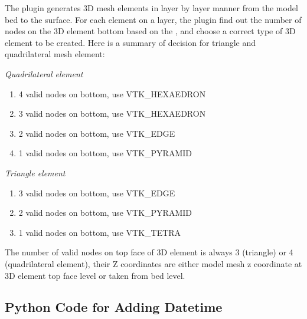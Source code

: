 \documentclass[12pt]{report}
\begin{document}
	The plugin generates 3D mesh elements in layer by layer manner from the model bed to the surface. For each element on a layer, the plugin find out the number of nodes on the 3D element bottom based on the , and choose a correct type of 3D element to be created. Here is a summary of decision for triangle and
quadrilateral mesh element:
	
\emph{Quadrilateral element}

\begin{enumerate}
\item  4 valid nodes on bottom, use VTK\_HEXAEDRON 
\item  3 valid nodes on bottom, use VTK\_HEXAEDRON
\item  2 valid nodes on bottom, use VTK\_EDGE
\item  1 valid nodes on bottom, use VTK\_PYRAMID
\end{enumerate}


\emph{Triangle element}

\begin{enumerate}
\item  3 valid nodes on bottom, use VTK\_EDGE
\item  2 valid nodes on bottom, use VTK\_PYRAMID
\item  1 valid nodes on bottom, use VTK\_TETRA
\end{enumerate}


  The number of valid nodes on top face of 3D element is always 3 (triangle) or 4 (quadrilateral element), their Z coordinates are either model mesh z coordinate at 3D element top face level or taken from bed level.  
		 
\clearpage
\begin{appendices}
 \chapter{Python Code for Adding Datetime}\label{append:stampImages}
 \begin{Code}
 \centering
 
 \end{Code}
\end{appendices}
\end{document}
